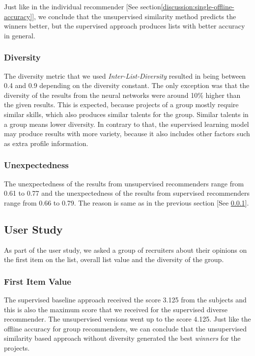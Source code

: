 Just like in the individual recommender [See section\ref{discussion:single-offline-accuracy}], we conclude that the unsupervised similarity method predicts the winners better, but the supervised approach produces lists with better accuracy in general.

\subsubsection{Diversity}\label{discussion:group-offline-diversity}

The diversity metric that we used \textit{Inter-List-Diversity} resulted in being between 0.4 and 0.9 depending on the diversity constant. The only exception was that the diversity of the results from the neural networks were around 10\% higher than the given results. This is expected, because projects of a group mostly require similar skills, which also produces similar talents for the group. Similar talents in a group means lower diversity. In contrary to that, the supervised learning model may produce results with more variety, because it also includes other factors such as extra profile information.

\subsubsection{Unexpectedness}

The unexpectedness of the results from unsupervised recommenders range from 0.61 to 0.77 and the unexpectedness of the results from supervised recommenders range from 0.66 to 0.79. The reason is same as in the previous section [See \ref{discussion:group-offline-diversity}].

\subsection{User Study}

As part of the user study, we asked a group of recruiters about their opinions on the first item on the list, overall list value and the diversity of the group.

\subsubsection{First Item Value}

The supervised baseline approach received the score 3.125 from the subjects and this is also the maximum score that we received for the supervised diverse recommender. The unsupervised versions went up to the score 4.125. Just like the offline accuracy for group recommenders, we can conclude that the unsupervised similarity based approach without diversity generated the best \textit{winners} for the projects.

